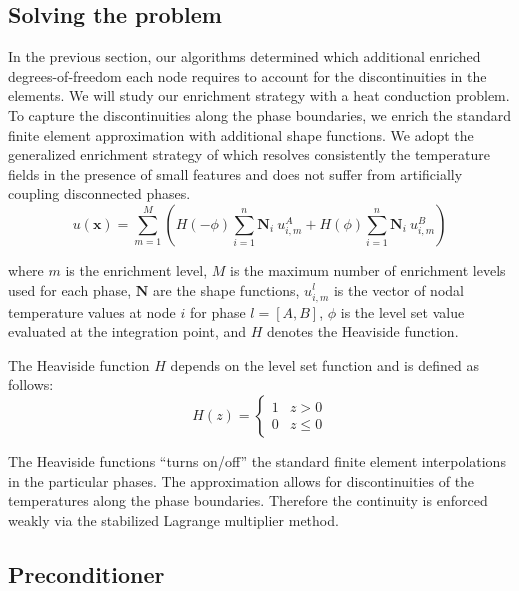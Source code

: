 
\subsection{Solving the problem}

In the previous section, our algorithms determined which additional enriched degrees-of-freedom each node requires to account for the discontinuities in the elements. We will study our enrichment strategy with a heat conduction problem. To capture the discontinuities along the phase boundaries, we enrich the standard finite element approximation with additional shape functions. We adopt the generalized enrichment strategy of \citet{MM:13} which resolves consistently the temperature fields in the presence of small features and does not suffer from artificially coupling disconnected phases.
%
\begin{equation}
	u(\mathbf{x}) = \sum \limits^{M}_{m=1} \left( H(-\phi) \sum\limits^{n}_{i=1} \mathbf{N}_i \ u_{i,m}^A
														 + H( \phi) \sum\limits^{n}_{i=1} \mathbf{N}_i \ u_{i,m}^B \right)
\end{equation}

where $m$ is the enrichment level, $M$ is the maximum number of enrichment levels used for each phase, $\mathbf{N}$ are the shape functions, $u^l_{i,m}$ is the vector of nodal temperature values at node $i$ for phase $l=[A,B]$, $\phi$ is the level set value evaluated at the integration point, and $H$ denotes the Heaviside function.

The Heaviside function $H$ depends on the level set function and is defined as follows:
%
\begin{equation}
	H(z) =
		\begin{cases}
			1 & z > 0 \\
			0 & z \le 0
		\end{cases}
\end{equation}

The Heaviside functions ``turns on/off'' the standard finite element interpolations in the particular phases. The approximation allows for discontinuities of the temperatures along the phase boundaries. Therefore the continuity is enforced weakly via the stabilized Lagrange multiplier method.


\subsection{Preconditioner}

